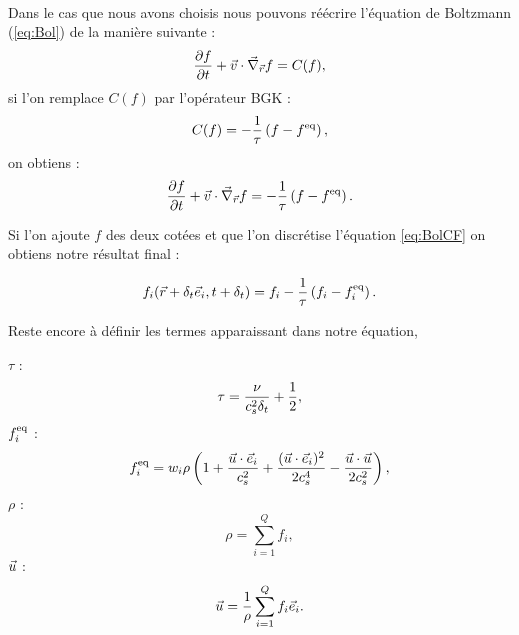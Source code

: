 \paragraph*{}
  Dans le cas que nous avons choisis nous pouvons réécrire l'équation de Boltzmann (\ref{eq:Bol})
  de la manière suivante :
  \begin{equation} \label{eq:BolnoF}
    \pderiv{f}{t} + \v \cdot \vnabla_{\r} f = C(f),
  \end{equation}
  si l'on remplace $C(f)$ par l'opérateur BGK :
  \begin{equation} \label{eq:BGK}
    C(f) = -\frac{1}{\tau}\left(f -f^{\text{eq}}\right),
  \end{equation}
  on obtiens :
  \begin{equation} \label{eq:BolCF}
    \pderiv{f}{t} + \v \cdot \vnabla_{\r} f = -\frac{1}{\tau}\left(f -\feq\right).
  \end{equation}
  
  Si l'on ajoute $f$ des deux cotées et que l'on discrétise l'équation \ref{eq:BolCF} on obtiens notre résultat final :
  
  \begin{equation} \label{eq:LBGK}
    f_i(\vec{r}+\delta_t \vec{e}_i, t + \delta_t) = f_i -\frac{1}{\tau}\left(f_i -f^{\text{eq}}_i\right).
  \end{equation}
  
  Reste encore à définir les termes apparaissant dans notre équation,
  \begin{itemize} \label{eq:defmacro}
    \itemb $\tau$ :
      \begin{equation} \label{eq:tau}
        \tau = \frac{\nu}{c_s^2 \delta_t} + \frac{1}{2},
      \end{equation}
    \itemb $f^{\text{eq}}_i$ :
      \begin{equation} \label{eq:feq}
        f^{\text{eq}}_i = w_i \rho \left(1 + \frac{\vec{u} \cdot \vec{e}_i}{c_s^2} + \frac{(\vec{u} \cdot \vec{e}_i)^2}{2 c_s^4} - \frac{\vec{u} \cdot \vec{u}}{2 c_s^2} \right),
      \end{equation}
      \itemb $\rho$ :
      \begin{equation} \label{eq:rho}
        \rho = \sum_{i=1}^Q f_i,
      \end{equation}
      \itemb $\vec{u}$ :
      \begin{equation} \label{eq:u}
        \vec{u} = \frac{1}{\rho}\sum_{i=1}^Q f_i\vec{e}_i.
      \end{equation}
  \end{itemize}
